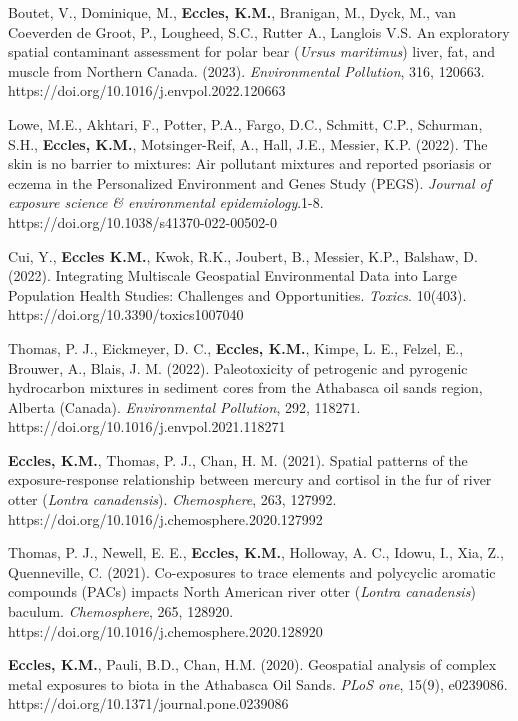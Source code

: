 \documentclass[margin,line]{res}
\begin{document}
\begin{resume}
\pagebreak

Boutet, V., Dominique, M., \textbf{Eccles, K.M.}, Branigan, M., Dyck, M., van Coeverden de Groot, P., Lougheed, S.C., Rutter A., Langlois V.S. An exploratory spatial contaminant assessment for polar bear (\textit{Ursus maritimus}) liver, fat, and muscle from Northern Canada. (2023). \textit{Environmental Pollution},  316, 120663. https://doi.org/10.1016/j.envpol.2022.120663

Lowe, M.E., Akhtari, F., Potter, P.A., Fargo, D.C., Schmitt, C.P., Schurman, S.H., \textbf{Eccles, K.M.}, Motsinger-Reif, A., Hall, J.E., Messier, K.P. (2022). The skin is no barrier to mixtures: Air pollutant mixtures and reported
psoriasis or eczema in the Personalized Environment and Genes Study (PEGS). \textit{Journal of exposure science \& environmental epidemiology}.1-8. https://doi.org/10.1038/s41370-022-00502-0

Cui, Y., \textbf{Eccles K.M.}, Kwok, R.K., Joubert, B., Messier, K.P., Balshaw, D. (2022). Integrating Multiscale Geospatial Environmental Data into Large Population Health Studies: Challenges and Opportunities. \textit{Toxics}. 10(403). https://doi.org/10.3390/toxics1007040

Thomas, P. J., Eickmeyer, D. C., \textbf{Eccles, K.M.}, Kimpe, L. E., Felzel, E., Brouwer, A., Blais, J. M. (2022). Paleotoxicity of petrogenic and pyrogenic hydrocarbon mixtures in sediment cores from the Athabasca oil sands region, Alberta (Canada). \textit{Environmental Pollution}, 292, 118271. \\
https://doi.org/10.1016/j.envpol.2021.118271

\textbf{Eccles, K.M.}, Thomas, P. J., Chan, H. M. (2021). Spatial patterns of the exposure-response relationship between mercury and cortisol in the fur of river otter (\textit{Lontra canadensis}). \textit{Chemosphere}, 263, 127992. https://doi.org/10.1016/j.chemosphere.2020.127992

Thomas, P. J., Newell, E. E., \textbf{Eccles, K.M.}, Holloway, A. C., Idowu, I., Xia, Z., Quenneville, C. (2021). Co-exposures to trace elements and polycyclic aromatic compounds (PACs) impacts North American river otter (\textit{Lontra canadensis}) baculum. \textit{Chemosphere}, 265, 128920.\\https://doi.org/10.1016/j.chemosphere.2020.128920

\textbf{Eccles, K.M.}, Pauli, B.D., Chan, H.M. (2020). Geospatial analysis of complex metal exposures to biota in the Athabasca Oil Sands. \textit{PLoS one}, 15(9), e0239086. \\https://doi.org/10.1371/journal.pone.0239086


\end{resume}
\end{document}
